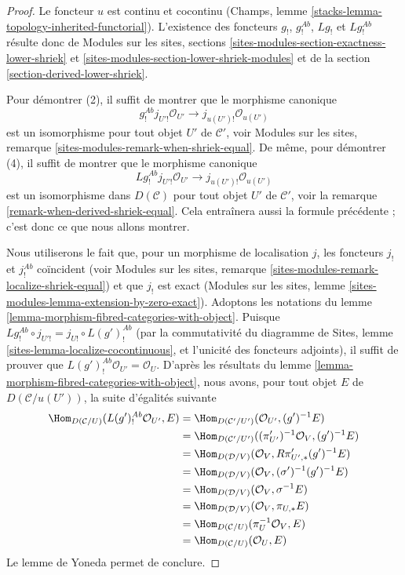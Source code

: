\begin{proof}
Le foncteur $u$ est continu et cocontinu
(Champs, lemme \ref{stacks-lemma-topology-inherited-functorial}).
L'existence des foncteurs $g_!$, $g_!^{\textit{Ab}}$,
$Lg_!$ et $Lg_!^{\textit{Ab}}$ résulte donc de
Modules sur les sites, sections
\ref{sites-modules-section-exactness-lower-shriek} et
\ref{sites-modules-section-lower-shriek-modules}
et de la
section \ref{section-derived-lower-shriek}.

\medskip\noindent
Pour démontrer (2), il suffit de montrer que le morphisme canonique
$$
g_!^{\textit{Ab}}j_{U'!}\mathcal{O}_{U'} \to j_{u(U')!}\mathcal{O}_{u(U')}
$$
est un isomorphisme pour tout objet $U'$ de $\mathcal{C}'$, voir
Modules sur les sites, remarque \ref{sites-modules-remark-when-shriek-equal}.
De même, pour démontrer (4), il suffit de montrer que le morphisme canonique
$$
Lg_!^{\textit{Ab}}j_{U'!}\mathcal{O}_{U'} \to j_{u(U')!}\mathcal{O}_{u(U')}
$$
est un isomorphisme dans $D(\mathcal{C})$ pour tout objet $U'$ de
$\mathcal{C}'$, voir la remarque \ref{remark-when-derived-shriek-equal}.
Cela entraînera aussi la formule précédente ; c'est donc ce que nous allons montrer.

\medskip\noindent
Nous utiliserons le fait que, pour un morphisme de localisation $j$, les
foncteurs $j_!$ et $j_!^{\textit{Ab}}$ coïncident (voir
Modules sur les sites, remarque \ref{sites-modules-remark-localize-shriek-equal})
et que $j_!$ est exact
(Modules sur les sites, lemme \ref{sites-modules-lemma-extension-by-zero-exact}).
Adoptons les notations du
lemme \ref{lemma-morphism-fibred-categories-with-object}.
Puisque $Lg_!^{\textit{Ab}} \circ j_{U'!} = j_{U!} \circ L(g')^{\textit{Ab}}_!$
(par la commutativité du diagramme de Sites, lemme \ref{sites-lemma-localize-cocontinuous},
et l'unicité des foncteurs adjoints), il suffit de prouver que
$L(g')^{\textit{Ab}}_!\mathcal{O}_{U'} = \mathcal{O}_U$. D'après les
résultats du
lemme \ref{lemma-morphism-fibred-categories-with-object},
nous avons, pour tout objet $E$ de $D(\mathcal{C}/u(U'))$, la suite
d'égalités suivante
\begin{align*}
\Hom_{D(\mathcal{C}/U)}(L(g')_!^{\textit{Ab}}\mathcal{O}_{U'}, E)
& =
\Hom_{D(\mathcal{C}'/U')}(\mathcal{O}_{U'}, (g')^{-1}E) \\
& =
\Hom_{D(\mathcal{C}'/U')}((\pi'_{U'})^{-1}\mathcal{O}_V, (g')^{-1}E) \\
& =
\Hom_{D(\mathcal{D}/V)}(\mathcal{O}_V, R\pi'_{U', *}(g')^{-1}E) \\
& =
\Hom_{D(\mathcal{D}/V)}(\mathcal{O}_V, (\sigma')^{-1}(g')^{-1}E) \\
& =
\Hom_{D(\mathcal{D}/V)}(\mathcal{O}_V, \sigma^{-1}E) \\
& =
\Hom_{D(\mathcal{D}/V)}(\mathcal{O}_V, \pi_{U, *}E) \\
& =
\Hom_{D(\mathcal{C}/U)}(\pi_U^{-1}\mathcal{O}_V, E) \\
& =
\Hom_{D(\mathcal{C}/U)}(\mathcal{O}_U, E)
\end{align*}
Le lemme de Yoneda permet de conclure.
\end{proof}

